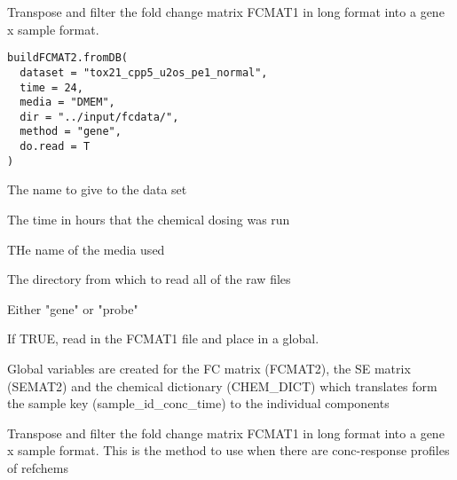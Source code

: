 \documentclass[letterpaper]{book}
\begin{document}
%
\begin{Description}\relax
Transpose and filter the fold change matrix FCMAT1 in long format into a
gene x sample format.
\end{Description}
%
\begin{Usage}
\begin{verbatim}
buildFCMAT2.fromDB(
  dataset = "tox21_cpp5_u2os_pe1_normal",
  time = 24,
  media = "DMEM",
  dir = "../input/fcdata/",
  method = "gene",
  do.read = T
)
\end{verbatim}
\end{Usage}
%
\begin{Arguments}
\begin{ldescription}
\item[\code{dataset}] The name to give to the data set

\item[\code{time}] The time in hours that the chemical dosing was run

\item[\code{media}] THe name of the media used

\item[\code{dir}] The directory from which to read all of the raw files

\item[\code{method}] Either "gene" or "probe"

\item[\code{do.read}] If TRUE, read in the FCMAT1 file and place in a global.
\end{ldescription}
\end{Arguments}
%
\begin{Value}
Global variables are created for the FC matrix (FCMAT2), the SE matrix (SEMAT2)
and the chemical dictionary (CHEM\_DICT) which translates form the sample key
(sample\_id\_conc\_time) to the individual components
\end{Value}
%
\begin{Description}\relax
Transpose and filter the fold change matrix FCMAT1 in long format into a
gene x sample format.
This is the method to use when there are conc-response profiles of refchems
\end{Description}
\end{document}
